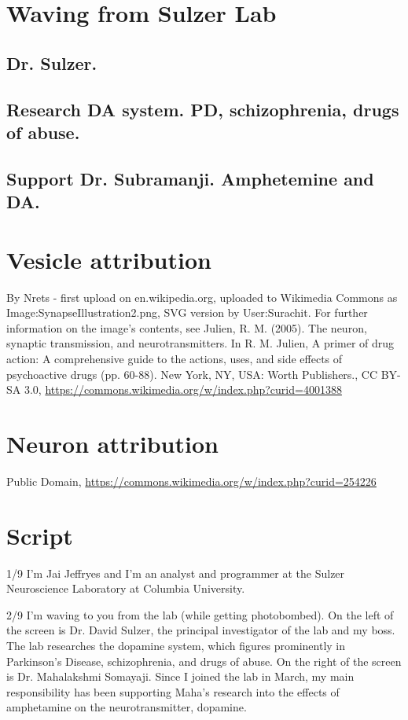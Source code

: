 \documentclass[11pt]{article}
\author{Jai Jeffryes}
\date{\today}
\title{}
\begin{document}
\tableofcontents

\section{Waving from Sulzer Lab}
\label{sec:org9661739}
\subsection{Dr. Sulzer.}
\label{sec:orgef1a641}
\subsection{Research DA system. PD, schizophrenia, drugs of abuse.}
\label{sec:orgfff9e56}
\subsection{Support Dr. Subramanji. Amphetemine and DA.}
\label{sec:orge5beeee}
\section{Vesicle attribution}
\label{sec:orge6e0431}
By Nrets - first upload on en.wikipedia.org, uploaded to Wikimedia Commons as Image:SynapseIllustration2.png, SVG version by User:Surachit. For further information on the image's contents, see Julien, R. M. (2005). The neuron, synaptic transmission, and neurotransmitters. In R. M. Julien, A primer of drug action: A comprehensive guide to the actions, uses, and side effects of psychoactive drugs (pp. 60-88). New York, NY, USA: Worth Publishers., CC BY-SA 3.0, \url{https://commons.wikimedia.org/w/index.php?curid=4001388}
\section{Neuron attribution}
\label{sec:org1b170ea}
Public Domain, \url{https://commons.wikimedia.org/w/index.php?curid=254226}
\section{Script}
\label{sec:org7335087}
1/9
I'm Jai Jeffryes and I'm an analyst and programmer at the Sulzer
Neuroscience Laboratory at Columbia University.

2/9 I'm waving to you from the lab (while getting photobombed). On the
left of the screen is Dr. David Sulzer, the principal investigator of
the lab and my boss. The lab researches the dopamine system, which
figures prominently in Parkinson's Disease, schizophrenia, and drugs
of abuse. On the right of the screen is Dr. Mahalakshmi
Somayaji. Since I joined the lab in March, my main responsibility has
been supporting Maha's research into the effects of amphetamine on
the neurotransmitter, dopamine.
\end{document}
